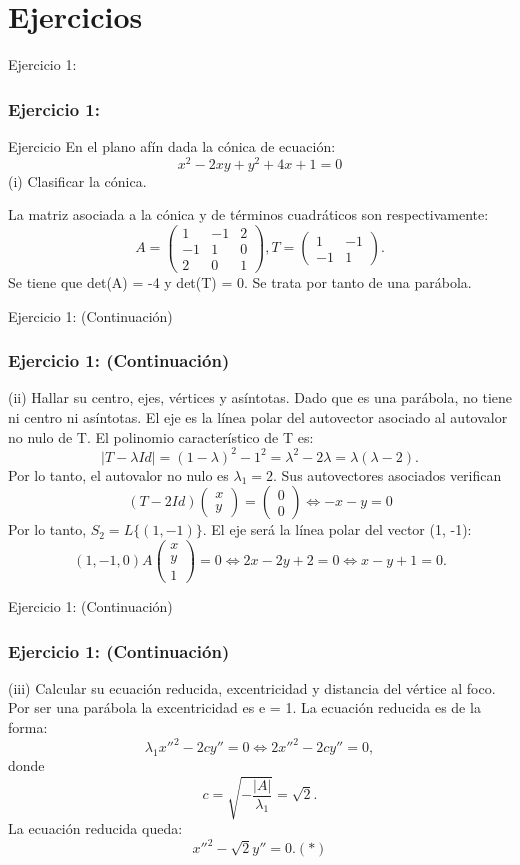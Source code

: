 \documentclass[xcolor={dvipsnames},aspectratio=169,10pt]{beamer}
\begin{document}
\section{Ejercicios}
\begin{frame}{Ejercicio 1:}
  \frametitle{Ejercicio 1:}
  \begin{block}{Ejercicio}
    En el plano afín dada la cónica de ecuación:
    \[x^2 - 2xy + y^2 + 4x + 1 = 0\]
    (i) Clasificar la cónica.
  \end{block}
    La matriz asociada a la cónica y de términos cuadráticos son respectivamente:
    \[A = \begin{pmatrix} 1 & -1 & 2 \\ -1 & 1 & 0 \\ 2 & 0 & 1 \end{pmatrix}, T = \begin{pmatrix} 1 & -1 \\ -1 & 1 \end{pmatrix}.\]
    Se tiene que det(A) = -4 y det(T) = 0. Se trata por tanto de una parábola.
\end{frame}

\begin{frame}{Ejercicio 1: (Continuación)}
  \frametitle{Ejercicio 1: (Continuación)}
    (ii) Hallar su centro, ejes, vértices y asíntotas.
    Dado que es una parábola, no tiene ni centro ni asíntotas.
    El eje es la línea polar del autovector asociado al autovalor no nulo de T.
    El polinomio característico de T es:
    \[|T - \lambda Id| = (1 - \lambda)^2 - 1^2 = \lambda^2 - 2\lambda = \lambda(\lambda - 2).\]
    Por lo tanto, el autovalor no nulo es $\lambda_1 = 2$. Sus autovectores asociados verifican
    \[(T - 2Id) \begin{pmatrix} x \\ y \end{pmatrix} = \begin{pmatrix} 0 \\ 0 \end{pmatrix} \Leftrightarrow -x - y = 0\]
    Por lo tanto, $S_2 = L\{(1, -1)\}$.
    El eje será la línea polar del vector (1, -1):
    \[(1, -1, 0) A \begin{pmatrix} x \\ y \\ 1 \end{pmatrix} = 0 \Leftrightarrow 2x - 2y + 2 = 0 \Leftrightarrow x - y + 1 = 0.\]
\end{frame}

\begin{frame}{Ejercicio 1: (Continuación)}
  \frametitle{Ejercicio 1: (Continuación)}
    (iii) Calcular su ecuación reducida, excentricidad y distancia del vértice al foco.
    Por ser una parábola la excentricidad es e = 1.
    La ecuación reducida es de la forma:
    \[\lambda_1x''^2 - 2cy'' = 0 \Leftrightarrow 2x''^2 - 2cy'' = 0,\]
    donde
    \[c = \sqrt{-\frac{|A|}{\lambda_1}} = \sqrt{2}.\]
    La ecuación reducida queda:
    \[x''^2 - \sqrt{2}y'' = 0. (*)\]
\end{frame}
\end{document}

